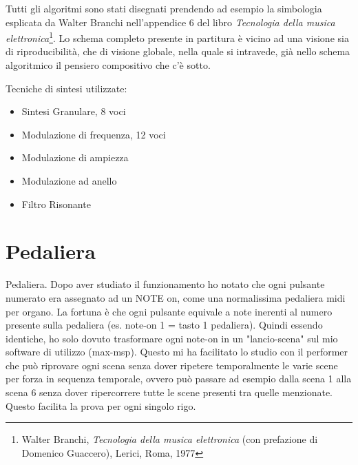 Tutti gli algoritmi sono stati disegnati prendendo ad esempio la simbologia esplicata da Walter Branchi nell'appendice 6 del libro \textit{Tecnologia della musica elettronica}\footnote{Walter Branchi, \textit{Tecnologia della musica elettronica} (con prefazione di Domenico Guaccero), Lerici, Roma, 1977}. Lo schema completo presente in partitura è vicino ad una visione sia di riproducibilità, che di visione globale, nella quale si intravede, già nello schema algoritmico il pensiero compositivo che c'è sotto.

Tecniche di sintesi utilizzate:
	\begin{itemize}
\item{Sintesi Granulare, 8 voci}
\item{Modulazione di frequenza, 12 voci}
\item{Modulazione di ampiezza}
\item{Modulazione ad anello}
\item{Filtro Risonante}
	\end{itemize}

\section{Pedaliera}

Pedaliera. Dopo aver studiato il funzionamento ho notato che ogni pulsante numerato era assegnato ad un NOTE on, come una normalissima pedaliera midi per organo. La fortuna è che ogni pulsante equivale a note inerenti al numero presente sulla pedaliera (es. note-on 1 = tasto 1 pedaliera). Quindi essendo identiche, ho solo dovuto trasformare ogni note-on in un "lancio-scena" sul mio software di utilizzo (max-msp). Questo mi ha facilitato lo studio con il performer che può riprovare ogni scena senza dover ripetere temporalmente le varie scene per forza in  sequenza temporale, ovvero può passare ad esempio dalla scena 1 alla scena 6 senza dover ripercorrere tutte le scene presenti tra quelle menzionate. Questo facilita la prova per ogni singolo rigo.
